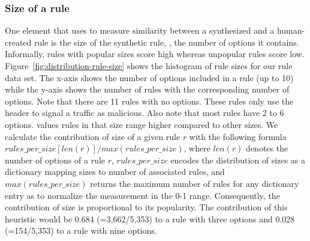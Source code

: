 \documentclass[sigconf,review, anonymous]{acmart}
\begin{document}
\subsubsection{Size of a rule}
\label{sec:heuristic-size-of-rule}
One element that \tname{} uses to measure similarity between a
synthesized and a human-created rule is the size of the synthetic
rule, \ie{}, the number of options it contains. Informally, rules with
popular sizes score high whereas unpopular rules score
low. Figure~\ref{fig:distribution-rule-size} shows the histogram of
rule sizes for our rule data set. The x-axis shows the number of
options included in a rule (up to 10) while the y-axis shows the
number of rules with the corresponding number of options. Note that
there are 11 rules with no options. These rules only use the header to
signal a traffic as malicious. Also note that most rules have 2 to 6
options. \tname{} values rules in that size range higher compared to
other sizes. We calculate the contribution of size of a given rule
$r$ with the following formula $\mathit{rules\_per\_size}[\mathit{len(r)}]/\mathit{max(rules\_per\_size)}$, where $\mathit{len(r)}$ denotes the number of options of a rule $r$,
$\mathit{rules\_per\_size}$ encodes the distribution of sizes as a
dictionary mapping sizes to number of associated rules, and
$\mathit{max(rules\_per\_size)}$ returns the maximum number of rules
for any dictionary entry as to normalize the measurement in the 0-1
range. Consequently, the contribution of size is proportional to its
popularity. The contribution of this heuristic would be 0.684
(=3,662/5,353) to a rule with three options and 0.028 (=154/5,353) to
a rule with nine options.




\pgfplotsset{width=6cm,compat=1.8}
\end{document}
